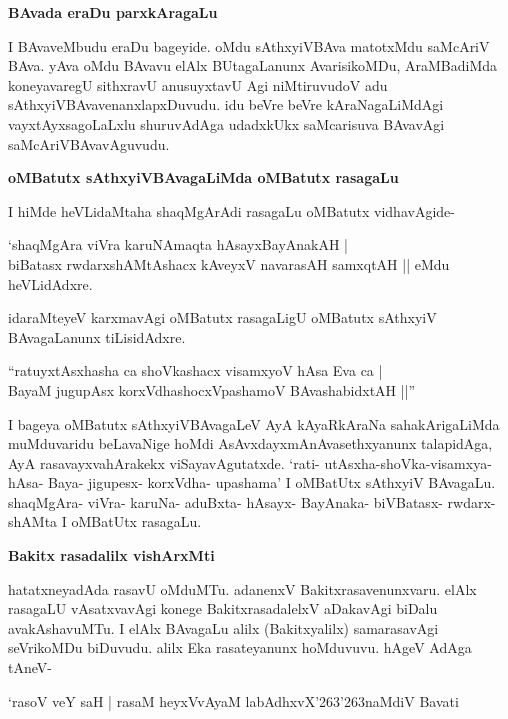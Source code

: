 {\bigskip
\noindent
{\large\bf BAvada eraDu parxkAragaLu}}\label{page230}
\medskip

\noindent
I BAvaveMbudu eraDu bageyide. oMdu sAthxyiVBAva matotxMdu saMcAriV BAva. yAva oMdu BAvavu elAlx BUtagaLanunx AvarisikoMDu, AraMBadiMda koneyavaregU sithxravU anusuyx\-tavU Agi niMtiruvudoV adu sAthxyiVBAvavenanxlapxDuvudu. idu beVre beVre kAraNagaLiMdAgi vayxtAyxsa\-goLaLxlu shuruvAdAga udadxkUkx saMcarisuva BAvavAgi saMcAriVBAvavAguvudu.

{\bigskip
\noindent
{\large\bf oMBatutx sAthxyiVBAvagaLiMda oMBatutx rasagaLu}}\label{page230}
\medskip

\noindent
I hiMde heVLidaMtaha shaqMgArAdi rasagaLu oMBatutx vidhavAgide-

\begin{shloka}
`shaqMgAra viVra karuNAmaqta hAsayxBayAnakAH |\\\label{230}
biBatasx rwdarxshAMtAshacx kAveyxV navarasAH samxqtAH || eMdu heVLidAdxre.
\end{shloka}

idaraMteyeV karxmavAgi oMBatutx rasagaLigU oMBatutx sAthxyiV BAvagaLanunx tiLisidAdxre.

\begin{shloka}
``ratuyxtAsxhasha ca shoVkashacx visamxyoV hAsa Eva ca |\\\label{230}
BayaM jugupAsx korxVdhashocxVpashamoV BAvashabidxtAH ||''
\end{shloka}

I bageya oMBatutx sAthxyiVBAvagaLeV AyA kAyaRkAraNa sahakArigaLiMda muMduvaridu beLa\-vaNige hoMdi AsAvxdayxmAnAvasethxyanunx talapidAga, AyA rasavayxvahArakekx viSayavAgutatxde. `rati-\- utAsxha-shoVka-visamxya- hAsa- Baya- jigupesx- korxVdha- upashama' I oMBatUtx sAthxyiV BAva\-gaLu. shaqMgAra- viVra- karuNa- aduBxta- hAsayx- BayAnaka- biVBatasx- rwdarx- shAMta I oMBatUtx rasagaLu.

{\bigskip
\noindent
{\large\bf Bakitx rasadalilx vishArxMti}}\label{page231}
\medskip

\noindent
hatatxneyadAda rasavU oMduMTu. adanenxV Bakitxrasavenunxvaru. elAlx rasagaLU vAsatxvavAgi konege BakitxrasadalelxV aDakavAgi biDalu avakAshavuMTu. I elAlx BAvagaLu alilx (Bakitxyalilx) samarasavAgi seVrikoMDu biDuvudu. alilx Eka rasateyanunx hoMduvuvu. hAgeV AdAga tAneV-

\begin{shloka}
`rasoV veY saH | rasaM heyxVvAyaM labAdhxvX\char'263\char'263naMdiV Bavati\label{231}
\end{shloka}

